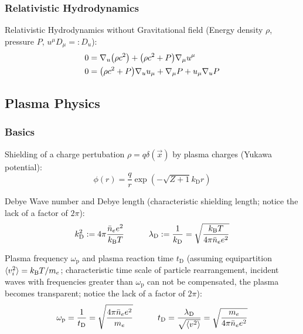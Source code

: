 		\subsubsection{Relativistic Hydrodynamics}
			Relativistic Hydrodynamics without Gravitational field (Energy density $\rho$, pressure $P$, $u^\mu D_\mu =: D_u$):
			\begin{equation}
				\begin{aligned}
					0 &= \nabla_u \qty(\rho c^2) + \qty(\rho c^2 + P) \nabla_\mu u^\mu \\
					0 &= \qty(\rho c^2 + P) \nabla_u u_\mu + \nabla_\mu P + u_\mu \nabla_u P \\
				\end{aligned}
			\end{equation}

	\subsection{Plasma Physics}
		\subsubsection{Basics}
			Shielding of a charge pertubation $\rho=q\delta(\vec{x})$ by plasma charges (Yukawa potential):
			\begin{equation}
				\phi(r) = \frac{q}{r} \exp(-\sqrt{Z+1}k_\text{D} r)
			\end{equation}

			\noindent
			Debye Wave number and Debye length (characteristic shielding length; notice the lack of a factor of $2\pi$):
			\begin{equation}
				k_\text{D}^2 := 4\pi \frac{\bar{n}_e e^2}{k_{\text{B}} T} \hspace{30pt}
				\lambda_\text{D} := \frac{1}{k_\text{D}} = \sqrt{\frac{k_{\text{B}} T}{4\pi \bar{n}_e e^2}}
			\end{equation}

			\noindent
			Plasma frequency $\omega_\text{p}$ and plasma reaction time $t_\text{D}$ (assuming equipartition $\langle v_i^2 \rangle = k_{\text{B}} T / m_e$; characteristic time scale of particle rearrangement, incident waves with frequencies greater than $\omega_\text{p}$ can not be compensated, the plasma becomes transparent; notice the lack of a factor of $2\pi$):
			\begin{equation}
				\omega_\text{p} = \frac{1}{t_\text{D}} = \sqrt{\frac{4\pi\bar{n}_e e^2}{m_e}} \hspace{30pt}
				t_\text{D} = \frac{\lambda_\text{D}}{\sqrt{\langle v^2 \rangle}} = \sqrt{\frac{m_e}{4\pi \bar{n}_e e^2}}
			\end{equation}


